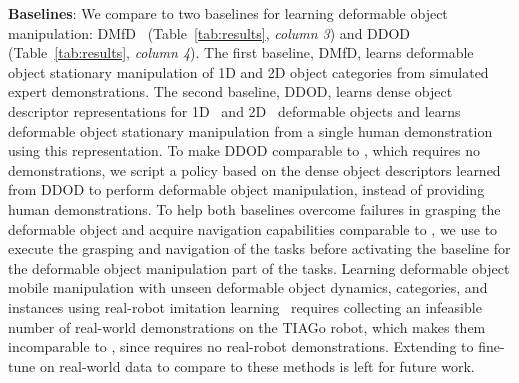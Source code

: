 \begin{table}[t]
\centering
\small
\caption{\textbf{Successful Trials} Out of 20 and Success Rates for \methodname{}, Baselines and Ablations}
\label{tab:results}
\end{table}
\textbf{Baselines}: We compare \methodname{} to two baselines for learning deformable object manipulation: DMfD~\cite{salhotra2022learning} (Table~\ref{tab:results}, \textit{column 3}) and DDOD~\cite{sundaresan2020learning,ganapathi2021learning} (Table~\ref{tab:results}, \textit{column 4}). The first baseline, DMfD, learns deformable object stationary manipulation of 1D and 2D object categories from simulated expert demonstrations. The second baseline, DDOD, learns dense object descriptor representations for 1D~\cite{sundaresan2020learning} and 2D~\cite{ganapathi2021learning} deformable objects and learns deformable object stationary manipulation from a single human demonstration using this representation. To make DDOD comparable to \methodname{}, which requires no demonstrations, we script a policy based on the dense object descriptors learned from DDOD to perform deformable object manipulation, instead of providing human demonstrations. To help both baselines overcome failures in grasping the deformable object and acquire navigation capabilities comparable to \methodname{}, we use \methodname{} to execute the grasping and navigation of the tasks before activating the baseline for the deformable object manipulation part of the tasks. Learning deformable object mobile manipulation with unseen deformable object dynamics, categories, and instances using real-robot imitation learning~\cite{black2024pi0,kim2024openvla,team2024octo,zhao2024aloha,zhao2023learning,nair2017combining,brohan2023rt,brohan2022rt,liu2024rdt} requires collecting an infeasible number of real-world demonstrations on the TIAGo robot, which makes them incomparable to \methodname{}, since \methodname{} requires no real-robot demonstrations. Extending \methodname{} to fine-tune on real-world data to compare to these methods is left for future work.

